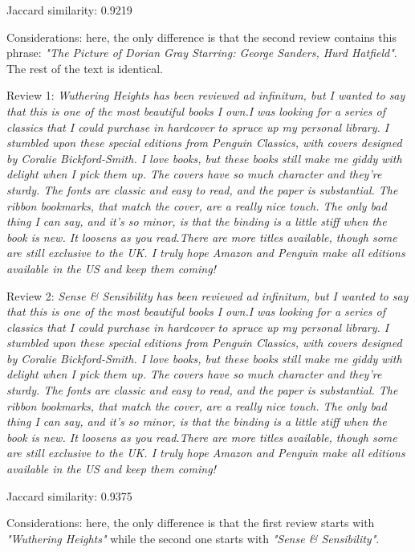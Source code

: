 \documentclass[12pt, a4paper]{article}
\begin{document}
\begin{itemize}
{    \item Jaccard similarity: 0.9219
    \item Considerations: here, the only difference is that the second review contains this phrase: \textit{"The Picture of Dorian Gray Starring: George Sanders, Hurd Hatfield"}. The rest of the text is identical.
    }
\end{itemize}
\dotfill
\begin{itemize}
    {\fontsize{9pt}{11pt}\selectfont
    \item Review 1: \textit{Wuthering Heights has been reviewed ad infinitum, but I wanted to say that this is one of the most beautiful books I own.I was looking for a series of classics that I could purchase in hardcover to spruce up my personal library. I stumbled upon these special editions from Penguin Classics, with covers designed by Coralie Bickford-Smith. I love books, but these books still make me giddy with delight when I pick them up. The covers have so much character and they're sturdy. The fonts are classic and easy to read, and the paper is substantial. The ribbon bookmarks, that match the cover, are a really nice touch. The only bad thing I can say, and it's so minor, is that the binding is a little stiff when the book is new. It loosens as you read.There are more titles available, though some are still exclusive to the UK. I truly hope Amazon and Penguin make all editions available in the US and keep them coming!}
    \item Review 2: \textit{Sense \& Sensibility has been reviewed ad infinitum, but I wanted to say that this is one of the most beautiful books I own.I was looking for a series of classics that I could purchase in hardcover to spruce up my personal library. I stumbled upon these special editions from Penguin Classics, with covers designed by Coralie Bickford-Smith. I love books, but these books still make me giddy with delight when I pick them up. The covers have so much character and they're sturdy. The fonts are classic and easy to read, and the paper is substantial. The ribbon bookmarks, that match the cover, are a really nice touch. The only bad thing I can say, and it's so minor, is that the binding is a little stiff when the book is new. It loosens as you read.There are more titles available, though some are still exclusive to the UK. I truly hope Amazon and Penguin make all editions available in the US and keep them coming!}
    \item Jaccard similarity: 0.9375
    \item Considerations: here, the only difference is that the first review starts with \textit{"Wuthering Heights"} while the second one starts with \textit{"Sense \& Sensibility"}.
    }
\end{itemize}
\end{document}
